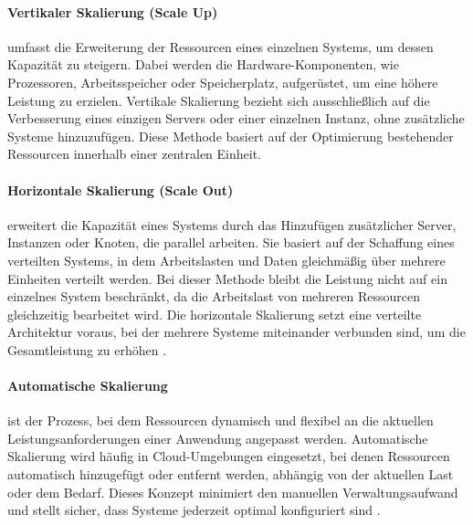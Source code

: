 \paragraph{Vertikaler Skalierung (Scale Up)} umfasst die Erweiterung der Ressourcen eines einzelnen Systems, um dessen Kapazität zu steigern. Dabei werden die Hardware-Komponenten, wie Prozessoren, Arbeitsspeicher oder Speicherplatz, aufgerüstet, um eine höhere Leistung zu erzielen. Vertikale Skalierung bezieht sich ausschließlich auf die Verbesserung eines einzigen Servers oder einer einzelnen Instanz, ohne zusätzliche Systeme hinzuzufügen. Diese Methode basiert auf der Optimierung bestehender Ressourcen innerhalb einer zentralen Einheit.
\paragraph{Horizontale Skalierung (Scale Out)} erweitert die Kapazität eines Systems durch das Hinzufügen zusätzlicher Server, Instanzen oder Knoten, die parallel arbeiten. Sie basiert auf der Schaffung eines verteilten Systems, in dem Arbeitslasten und Daten gleichmäßig über mehrere Einheiten verteilt werden. Bei dieser Methode bleibt die Leistung nicht auf ein einzelnes System beschränkt, da die Arbeitslast von mehreren Ressourcen gleichzeitig bearbeitet wird. Die horizontale Skalierung setzt eine verteilte Architektur voraus, bei der mehrere Systeme miteinander verbunden sind, um die Gesamtleistung zu erhöhen \cite{ibm-scaling}.
\paragraph{Automatische Skalierung} ist der Prozess, bei dem Ressourcen dynamisch und flexibel an die aktuellen Leistungsanforderungen einer Anwendung angepasst werden. Automatische Skalierung wird häufig in Cloud-Umgebungen eingesetzt, bei denen Ressourcen automatisch hinzugefügt oder entfernt werden, abhängig von der aktuellen Last oder dem Bedarf. Dieses Konzept minimiert den manuellen Verwaltungsaufwand und stellt sicher, dass Systeme jederzeit optimal konfiguriert sind \cite{mic-autoscaling}.


